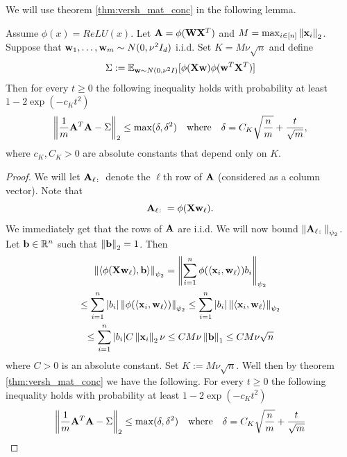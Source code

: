 We will use theorem \ref{thm:versh_mat_conc} in the following lemma.
\begin{lemma}\label{lem:feature_conc}
Assume $\phi(x) = ReLU(x)$.  Let $\mathbf{A} = \phi(\mathbf{W} \mathbf{X}^T)$ and $M = \max_{i \in [n]} \left\lVert\mathbf{x}_i\right\rVert_2$.  Suppose that $\mathbf{w}_1, \ldots, \mathbf{w}_m \sim N(0, \nu^2 I_d)$ i.i.d.  Set $K = M \nu \sqrt{n}$ and define
\[\Sigma := \mathbb{E}_{\mathbf{w} \sim N(0, \nu^2 I)}[\phi(\mathbf{X} \mathbf{w}) \phi(\mathbf{w}^T \mathbf{X}^T)]\]
Then for every $t \geq 0$ the following inequality holds with probability at least $1 - 2\exp(-c_K t^2)$
\[ 
\left\lVert\frac{1}{m} \mathbf{A}^T \mathbf{A} - \Sigma\right\rVert_2 \leq \max(\delta, \delta^2) \quad \text{where} \quad \delta = C_K \sqrt{\frac{n}{m}} + \frac{t}{\sqrt{m}}, 
\]
where $c_K, C_K > 0$ are absolute constants that depend only on $K$.
\end{lemma}
\begin{proof}
We will let $\mathbf{A}_{\ell \colon}$ denote the $\ell$th row of $\mathbf{A}$ (considered as a column vector).  Note that
\[ 
\mathbf{A}_{\ell \colon} = \phi(\mathbf{X} \mathbf{w}_\ell). 
\]
We immediately get that the rows of $\mathbf{A}$ are i.i.d.  We will now bound $\left\lVert\mathbf{A}_{\ell \colon}\right\rVert_{\psi_2}$.  Let $\mathbf b \in \mathbb{R}^n$ such that $\left\lVert\mathbf b\right\rVert_2 = 1$. 
Then 
\begin{gather*}
\left\lVert\langle \phi(\mathbf{X} \mathbf{w}_\ell), \mathbf b \rangle\right\rVert_{\psi_2} = \left\lVert\sum_{i = 1}^n \phi(\langle \mathbf{x}_i, \mathbf{w}_\ell \rangle) b_i\right\rVert_{\psi_2} \\
\leq \sum_{i = 1}^n |b_i| \left\lVert\phi(\langle \mathbf{x}_i, \mathbf{w}_\ell \rangle)\right\rVert_{\psi_2} \leq \sum_{i = 1}^n |b_i| \left\lVert\langle \mathbf{x}_i, \mathbf{w}_\ell \rangle\right\rVert_{\psi_2} \\
\leq \sum_{i = 1}^n |b_i| C \left\lVert\mathbf{x}_i\right\rVert_2 \nu \leq C M \nu \left\lVert\mathbf b\right\rVert_1 \leq CM\nu \sqrt{n}
\end{gather*}
where $C > 0$ is an absolute constant.  Set $K :=  M \nu \sqrt{n}$.  Well then by theorem \ref{thm:versh_mat_conc} we have the following.  For every $t \geq 0$ the following inequality holds with probability at least $1 - 2\exp(-c_K t^2)$
\[ \left\lVert\frac{1}{m} \mathbf{A}^T \mathbf{A} - \Sigma\right\rVert_2 \leq \max(\delta, \delta^2) \quad \text{where} \quad \delta = C_K \sqrt{\frac{n}{m}} + \frac{t}{\sqrt{m}} \]
\end{proof}


